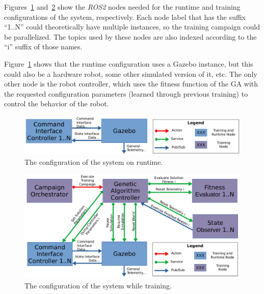 \documentclass[conference]{IEEEtran}
\begin{document}
	Figures~\ref{fig:runtime_configuration} and~\ref{fig:training_configuration} show the \textit{ROS2} nodes needed for the runtime and training configurations of the system, respectively. Each node label that has the suffix ``1..N'' could theoretically have multiple instances, so the training campaign could be parallelized. The topics used by these nodes are also indexed according to the ``i'' suffix of those names.

	Figure~\ref{fig:runtime_configuration} shows that the runtime configuration uses a Gazebo instance, but this could also be a hardware robot, some other simulated version of it, etc. The only other node is the robot controller, which uses the fitness function of the \ac{GA} with the requested configuration parameters (learned through previous training) to control the behavior of the robot.
	
	\begin{figure}[htbp]
		\centerline{\includegraphics[width=\columnwidth]{images/runtime_configuration.png}}
		\caption{The configuration of the system on runtime.}
		\label{fig:runtime_configuration}
	\end{figure}

	\begin{figure}[htbp]
		\centerline{\includegraphics[width=\columnwidth]{images/training_configuration.png}}
		\caption{The configuration of the system while training.}
		\label{fig:training_configuration}
	\end{figure}
\end{document}
